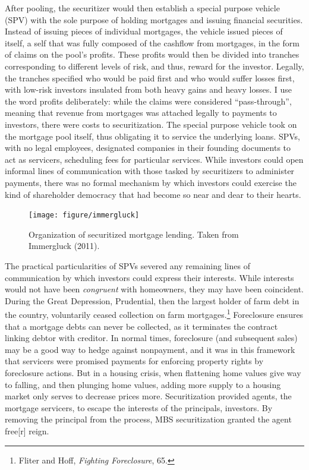 \documentclass[12pt,oneside]{psthesis}
\begin{document}
After pooling, the securitizer would then establish a special purpose vehicle (SPV) with the sole purpose of holding mortgages and issuing financial securities.
Instead of issuing pieces of individual mortgages, the vehicle issued pieces of itself, a self that was fully composed of the cashflow from mortgages, in the form of claims on the pool's profits.
These profits would then be divided into tranches corresponding to different levels of risk, and thus, reward for the investor.
Legally, the tranches specified who would be paid first and who would suffer losses first, with low-risk investors insulated from both heavy gains and heavy losses.
I use the word profits deliberately: while the claims were considered ``pass-through'', meaning that revenue from mortgages was attached legally to payments to investors, there were costs to securitization.
The special purpose vehicle took on the mortgage pool itself, thus obligating it to service the underlying loans.
SPVs, with no legal employees, designated companies in their founding documents to act as servicers, scheduling fees for particular services.
While investors could open informal lines of communication with those tasked by securitizers to administer payments, there was no formal mechanism by which investors could exercise the kind of shareholder democracy that had become so near and dear to their hearts.
\begin{figure}

{\centering \texttt{[image: figure/immergluck]} 

}

\caption{Organization of securitized mortgage lending. Taken from Immergluck (2011).}\label{fig:immergluck}
\end{figure}
The practical particularities of SPVs severed any remaining lines of communication by which investors could express their interests.
While interests would not have been \emph{congruent} with homeowners, they may have been coincident.
During the Great Depression, Prudential, then the largest holder of farm debt in the country, voluntarily ceased collection on farm mortgages.\footnote{Fliter and Hoff, \emph{Fighting Foreclosure}, 65.}
Foreclosure ensures that a mortgage debts can never be collected, as it terminates the contract linking debtor with creditor.
In normal times, foreclosure (and subsequent sales) may be a good way to hedge against nonpayment, and it was in this framework that servicers were promised payments for enforcing property rights by foreclosure actions.
But in a housing crisis, when flattening home values give way to falling, and then plunging home values, adding more supply to a housing market only serves to decrease prices more.
Securitization provided agents, the mortgage servicers, to escape the interests of the principals, investors.
By removing the principal from the process, MBS securitization granted the agent free{[}r{]} reign.
\end{document}
